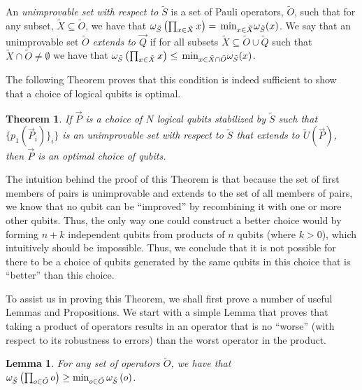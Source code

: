 \documentclass[twocolumn,showpacs,preprintnumbers,amsmath,amssymb,nofootinbib,pra,floatfix]{revtex4-1}
\newtheorem{theorem}{Theorem}
\newtheorem{lemma}{Lemma}
\newenvironment{definition}[1][Definition]{\begin{trivlist}
\item[\hskip \labelsep {\bfseries #1}]}{\end{trivlist}}
\newenvironment{remark}[1][Remark]{\begin{trivlist}
\item[\hskip \labelsep {\bfseries #1}]}{\end{trivlist}}
\newcommand{\lst}{\vec}
\newcommand{\set}{\tilde}
\begin{document}
\begin{definition}
An \emph{unimprovable set with respect to $\set S$} is a set of Pauli operators, $\set O$, such that for any subset, $\set X\subseteq \set O$, we have that $\om_{\set S}\paren{\prod_{x\in \set X} x} = \min_{x\in\set X}\om_{\set S}(x)$.  We say that an unimprovable set $\set O$ \emph{extends to $\lst Q$} if for all subsets $\set X \subseteq \set O\cup\set Q$ such that $\set X\cap \set O \ne \emptyset$ we have that $\om_{\set S}\paren{\prod_{x\in \set X} x} \le \min_{x\in\set X\cap \set O}\om_{\set S}(x)$.
\end{definition}
The following Theorem proves that this condition is indeed sufficient to show that a choice of logical qubits is optimal.
\begin{theorem}
\label{optimality-condition}
If $\lst P$ is a choice of $N$ logical qubits stabilized by $\set S$ such that $\{p_1(\lst P_i)\}_i\}$ is an unimprovable set with respect to $\set S$ that extends to $\set U(\lst P)$, then $\lst P$ is an optimal choice of qubits.
\end{theorem}

\begin{remark}
The intuition behind the proof of this Theorem is that because the set of first members of pairs is unimprovable and extends to the set of all members of pairs, we know that no qubit can be ``improved'' by recombining it with one or more other qubits.  Thus, the only way one could construct a better choice would by forming $n+k$ independent qubits from products of $n$ qubits (where $k>0$), which intuitively should be impossible.  Thus, we conclude that it is not possible for there to be a choice of qubits generated by the same qubits in this choice that is ``better'' than this choice.

To assist us in proving this Theorem, we shall first prove a number of useful Lemmas and Propositions.  We start with a simple Lemma that proves that taking a product of operators results in an operator that is no ``worse'' (with respect to its robustness to errors) than the worst operator in the product.
\end{remark}
\begin{lemma}
\label{combinations-can't-make-things-worse}
For any set of operators $\set O$, we have that $\om_{\set S}\paren{\prod_{o\in\set O} o} \ge \text{min}_{o\in \set O}\,\om_{\set S}\paren{o}$.
\end{lemma}
\end{document}
